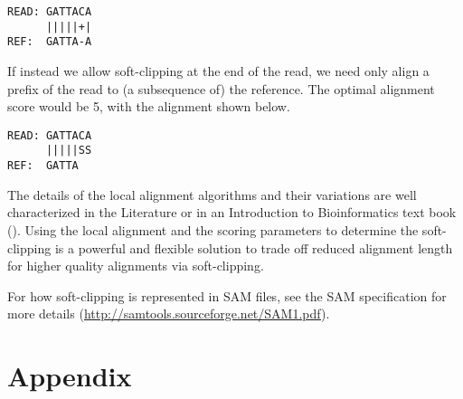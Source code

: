 \documentclass[a4paper,12pt]{book}
\begin{document}
\begin{verbatim}
READ: GATTACA
      |||||+|
REF:  GATTA-A
\end{verbatim}

If instead we allow soft-clipping at the end of the read, we need only align a prefix of the read to (a subsequence of) the reference.  
The optimal alignment score would be 5, with the alignment shown below.
\begin{verbatim}
READ: GATTACA
      |||||SS
REF:  GATTA
\end{verbatim}

The details of the local alignment algorithms and their variations are well characterized in the Literature or in an Introduction to Bioinformatics text book (\cite{jones2004}).  
Using the local alignment and the scoring parameters to determine the soft-clipping is a powerful and flexible solution to trade off reduced alignment length for higher quality alignments via soft-clipping.

For how soft-clipping is represented in SAM files, see the SAM specification for more details (\url{http://samtools.sourceforge.net/SAM1.pdf}).

\chapter{Appendix}

{}


\end{document}
